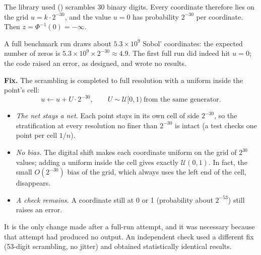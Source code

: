 \begin{esempio}[title={Example: the point exactly at zero}]
The library used () scrambles 30 binary digits. Every coordinate therefore lies on the
grid $u=k\cdot2^{-30}$, and the value $u=0$ has probability $2^{-30}$ per coordinate. Then $z=\Phi^{-1}(0)=-\infty$.

A full benchmark run draws about $5.3\times10^9$ Sobol' coordinates: the expected number of zeros is
$5.3\times10^9\times2^{-30}\approx4.9$. The first full run did indeed hit $u=0$; the code raised an error, as
designed, and wrote no results.

\textbf{Fix.} The scrambling is completed to full resolution with a uniform inside the point's cell:
\[
u\leftarrow u+U\cdot2^{-30},\qquad U\sim\mathcal U[0,1)\ \text{from the same generator}.
\]
\begin{itemize}
\item \emph{The net stays a net.} Each point stays in its own cell of side $2^{-30}$, so the stratification at every
resolution no finer than $2^{-30}$ is intact (a test checks one point per cell $1/n$).
\item \emph{No bias.} The digital shift makes each coordinate uniform on the grid of $2^{30}$ values; adding a
uniform inside the cell gives exactly $\mathcal U(0,1)$. In fact, the small $O(2^{-30})$ bias of the grid, which
always uses the left end of the cell, disappears.
\item \emph{A check remains.} A coordinate still at 0 or 1 (probability about $2^{-53}$) still raises an error.
\end{itemize}
It is the only change made after a full-run attempt, and it was necessary because that attempt had produced no
output. An independent check used a different fix (53-digit scrambling, no jitter) and obtained statistically
identical results.
\end{esempio}

